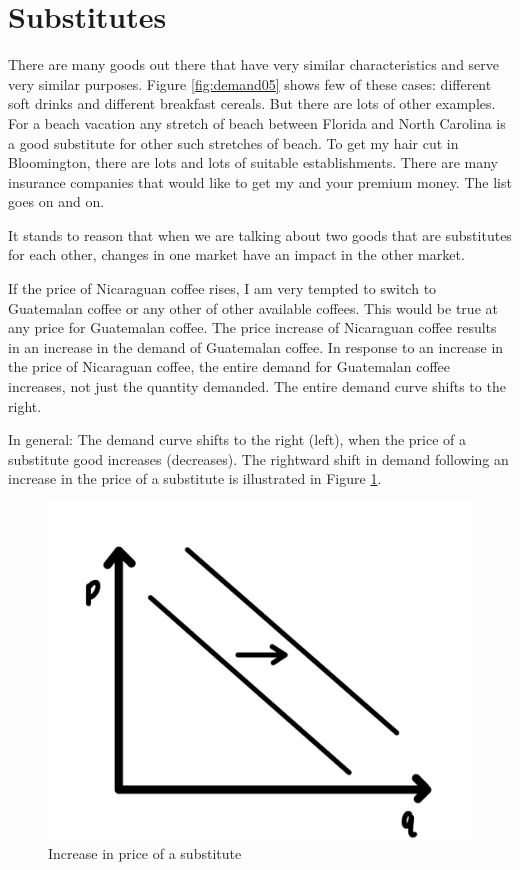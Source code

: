 \documentclass[
]{book}
\begin{document}
\hypertarget{substitutes}{%
\section{Substitutes}\label{substitutes}}

There are many goods out there that have very similar characteristics and serve very similar purposes. Figure \ref{fig:demand05} shows few of these cases: different soft drinks and different breakfast cereals. But there are lots of other examples. For a beach vacation any stretch of beach between Florida and North Carolina is a good substitute for other such stretches of beach. To get my hair cut in Bloomington, there are lots and lots of suitable establishments. There are many insurance companies that would like to get my and your premium money. The list goes on and on.

It stands to reason that when we are talking about two goods that are substitutes for each other, changes in one market have an impact in the other market.

If the price of Nicaraguan coffee rises, I am very tempted to switch to Guatemalan coffee or any other of other available coffees. This would be true at any price for Guatemalan coffee. The price increase of Nicaraguan coffee results in an increase in the demand of Guatemalan coffee. In response to an increase in the price of Nicaraguan coffee, the entire demand for Guatemalan coffee increases, not just the quantity demanded. The entire demand curve shifts to the right.

In general: The demand curve shifts to the right (left), when the price of a substitute good increases (decreases). The rightward shift in demand following an increase in the price of a substitute is illustrated in Figure \ref{fig:demand07}.

\begin{figure}

{\centering \includegraphics[width=0.75\linewidth]{img/demand/fig7} 

}

\caption{Increase in price of a substitute}\label{fig:demand07}
\end{figure}
\end{document}
